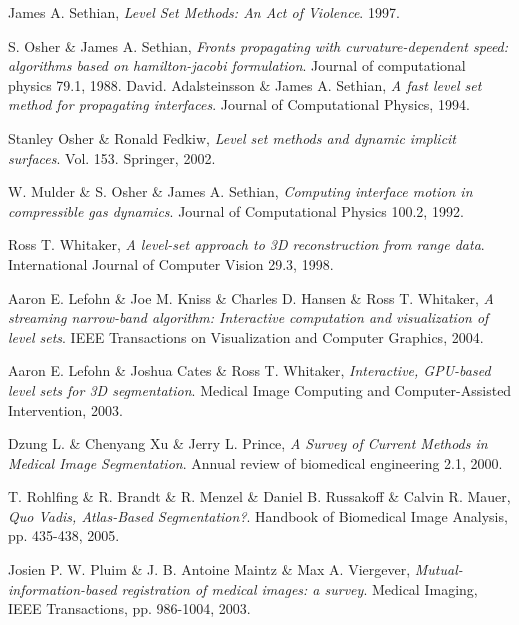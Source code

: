 \begin{thebibliography}{99}

	James A. Sethian,
	\emph{Level Set Methods: An Act of Violence}.
	1997.

	S. Osher \& James A. Sethian,
	\emph{Fronts propagating with curvature-dependent speed: algorithms based on hamilton-jacobi formulation}.
	Journal of computational physics 79.1,
	1988.
	David. Adalsteinsson \& James A. Sethian,
	\emph{A fast level set method for propagating interfaces}.
	Journal of Computational Physics,
	1994.

	Stanley Osher \& Ronald Fedkiw,
	\emph{Level set methods and dynamic implicit surfaces}.
	Vol. 153. Springer,
	2002.

	W. Mulder \& S. Osher \& James A. Sethian,
	\emph{Computing interface motion in compressible gas dynamics}.
	Journal of Computational Physics 100.2,
	1992.

	Ross T. Whitaker,
	\emph{A level-set approach to 3D reconstruction from range data}.
	International Journal of Computer Vision 29.3,
	1998.

	Aaron E. Lefohn \& Joe M. Kniss \& Charles D. Hansen \& Ross T. Whitaker,
	\emph{A streaming narrow-band algorithm: Interactive computation and visualization of level sets}.
	IEEE Transactions on Visualization and Computer Graphics,
	2004.

	Aaron E. Lefohn \& Joshua Cates \& Ross T. Whitaker,
	\emph{Interactive, GPU-based level sets for 3D segmentation}.
	 Medical Image Computing and Computer-Assisted Intervention,
	2003.


	Dzung L. \& Chenyang Xu \& Jerry L. Prince, 
	\emph{A Survey of Current Methods in Medical Image Segmentation}.
	Annual review of biomedical engineering 2.1,
	2000.

	T. Rohlfing \& R. Brandt \& R. Menzel \& Daniel B. Russakoff \& Calvin R. Mauer,
	\emph{Quo Vadis, Atlas-Based Segmentation?}.
	Handbook of Biomedical Image Analysis, pp. 435-438,
	2005.	

	Josien P. W. Pluim \& J. B. Antoine Maintz \& Max A. Viergever,
	\emph{Mutual-information-based registration of medical images: a survey}.
	Medical Imaging, IEEE Transactions, pp. 986-1004,
	2003.
	
	

	

\end{thebibliography}
